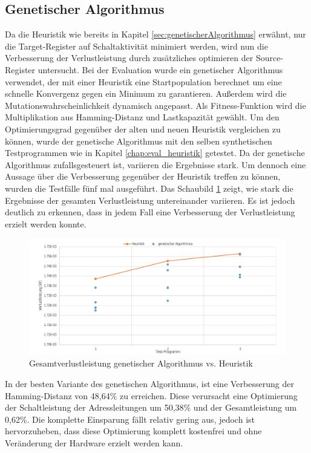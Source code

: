 \subsection{Genetischer Algorithmus}
Da die Heuristik wie bereits in Kapitel \ref{sec:genetischerAlgorithmus} erwähnt, nur die Target-Register auf Schaltaktivität minimiert werden, wird nun die Verbesserung der Verlustleistung durch zusätzliches optimieren der Source-Register untersucht.
Bei der Evaluation wurde ein genetischer Algorithmus verwendet, der mit einer Heuristik eine Startpopulation berechnet um eine schnelle Konvergenz gegen ein Minimum zu garantieren. Außerdem wird die Mutationswahrscheinlichkeit dynamisch angepasst. Als Fitness-Funktion wird die Multiplikation aus Hamming-Distanz und Lastkapazität gewählt. 
Um den Optimierungsgrad gegenüber der alten und neuen Heuristik vergleichen zu können, wurde der genetische Algorithmus mit den selben synthetischen Testprogrammen wie in Kapitel \ref{chap:eval_heuristik} getestet.
Da der genetische Algorithmus zufallsgesteuert ist, variieren die Ergebnisse stark. Um dennoch eine Aussage über die Verbesserung gegenüber der Heuristik treffen zu können, wurden die Testfälle fünf mal ausgeführt. Das Schaubild  \ref{fig:eval_genetic_total_power} zeigt, wie stark die Ergebnisse der gesamten Verlustleistung untereinander variieren. Es ist jedoch deutlich zu erkennen, dass in jedem Fall eine Verbesserung der Verlustleistung erzielt werden konnte.

\begin{figure}[H]
	\centering
	\includegraphics[width=\textwidth]{fig/eval_genetic_total_power.pdf}
	\caption{Gesamtverlustleistung genetischer Algorithmus vs. Heuristik}
	\label{fig:eval_genetic_total_power}
\end{figure}

In der besten Variante des genetischen Algorithmus, ist eine Verbesserung der Hamming-Distanz von 48,64\% zu erreichen. Diese verursacht eine Optimierung der Schaltleistung der Adressleitungen um 50,38\% und der Gesamtleistung um 0,62\%. Die komplette Einsparung fällt relativ gering aus, jedoch ist hervorzuheben, dass diese Optimierung komplett \glqq kostenfrei \grqq und ohne Veränderung der Hardware erzielt werden kann.

